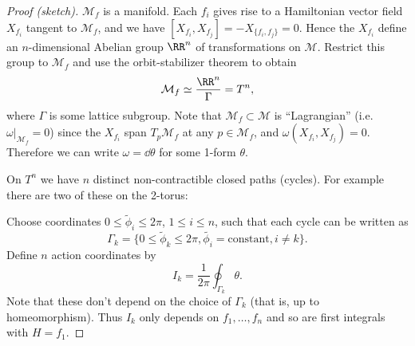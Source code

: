 \documentclass{jknotes}
\begin{document}
\begin{proof}[Proof (sketch)]
    \(\mathcal{M}_f\) is a manifold. Each \(f_i\) gives rise to a Hamiltonian vector field \(X_{f_i}\) tangent to \(\mathcal{M}_f\), and we have \([X_{f_i},X_{f_j}] = -X_{\{f_i,f_j\}}=0\). Hence the \(X_{f_i}\) define an \(n\)-dimensional Abelian group \(\RR^n\) of transformations on \(\mathcal{M}\). Restrict this group to \(\mathcal{M}_f\) and use the orbit-stabilizer theorem to obtain
    \begin{equation}
        \mathcal{M}_f \simeq \frac{\RR^n}{\Gamma} = T^n,
    \end{equation}
    where \(\Gamma\) is some lattice subgroup. Note that \(\mathcal{M}_f\subset\mathcal{M}\) is ``Lagrangian'' (i.e.\ \(\omega|_{\mathcal{M}_f}=0\)) since the \(X_{f_i}\) span \(T_p\mathcal{M}_f\) at any \(p\in\mathcal{M}_f\), and \(\omega(X_{f_i},X_{f_j}) = 0\). Therefore we can write \(\omega=\dd{\theta}\) for some 1-form \(\theta\).

    On \(T^n\) we have \(n\) distinct non-contractible closed paths (cycles). For example there are two of these on the 2-torus:
    \begin{figure}[H]
        \centering
    \end{figure}
    Choose coordinates \(0 \le \tilde{\phi}_i \le 2\pi\), \(1 \le i \le n\), such that each cycle can be written as
    \begin{equation}
        \Gamma_k = \{0 \le \tilde{\phi}_k \le 2\pi, \tilde{\phi_i} = \text{constant}, i \ne k\}.
    \end{equation}
    Define \(n\) action coordinates by
    \begin{equation}
        I_k = \frac{1}{2\pi}\oint_{\Gamma_k} \theta.
    \end{equation}
    Note that these don't depend on the choice of \(\Gamma_k\) (that is, up to homeomorphism). Thus \(I_k\) only depends on \(f_1,\dots,f_n\) and so are first integrals with \(H=f_1\).
    

\end{proof}
\end{document}
